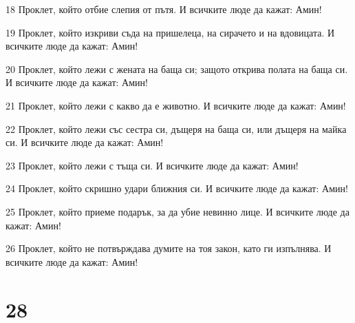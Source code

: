 \par 18 Проклет, който отбие слепия от пътя. И всичките люде да кажат: Амин!
\par 19 Проклет, който изкриви съда на пришелеца, на сирачето и на вдовицата. И всичките люде да кажат: Амин!
\par 20 Проклет, който лежи с жената на баща си; защото открива полата на баща си. И всичките люде да кажат: Амин!
\par 21 Проклет, който лежи с какво да е животно. И всичките люде да кажат: Амин!
\par 22 Проклет, който лежи със сестра си, дъщеря на баща си, или дъщеря на майка си. И всичките люде да кажат: Амин!
\par 23 Проклет, който лежи с тъща си. И всичките люде да кажат: Амин!
\par 24 Проклет, който скришно удари ближния си. И всичките люде да кажат: Амин!
\par 25 Проклет, който приеме подарък, за да убие невинно лице. И всичките люде да кажат: Амин!
\par 26 Проклет, който не потвърждава думите на тоя закон, като ги изпълнява. И всичките люде да кажат: Амин!

\chapter{28}

